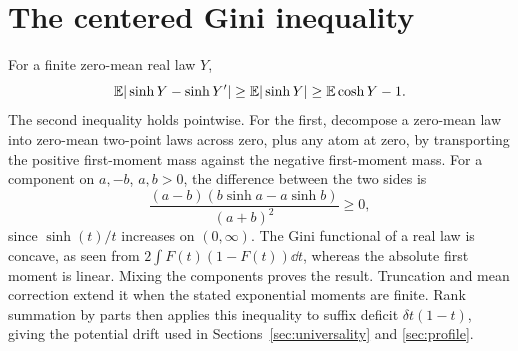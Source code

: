 \section{The centered Gini inequality}\label{app:gini}
For a finite zero-mean real law $Y$,
\[
 \mathbb E|\sinh Y-\sinh Y'|\ge\mathbb E|\sinh Y|
 \ge\mathbb E\cosh Y-1.
\]
The second inequality holds pointwise. For the first, decompose a zero-mean law into zero-mean two-point laws across zero, plus any atom at zero, by transporting the positive first-moment mass against the negative first-moment mass. For a component on $a,-b$, $a,b>0$, the difference between the two sides is
\[
 \frac{(a-b)(b\sinh a-a\sinh b)}{(a+b)^2}\ge0,
\]
since $\sinh(t)/t$ increases on $(0,\infty)$. The Gini functional of a real law is concave, as seen from $2\int F(t)(1-F(t))\dd t$, whereas the absolute first moment is linear. Mixing the components proves the result. Truncation and mean correction extend it when the stated exponential moments are finite. Rank summation by parts then applies this inequality to suffix deficit $\delta t(1-t)$, giving the potential drift used in Sections~\ref*{sec:universality} and \ref*{sec:profile}.
